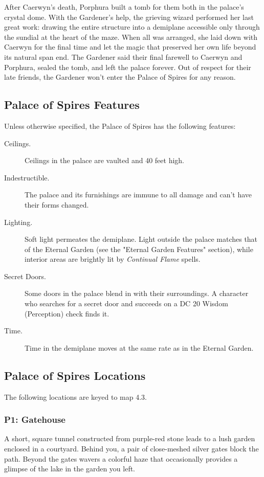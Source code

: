 \documentclass[10pt,a4paper,twoside,bg=print,twocolumn,openany,nodeprecatedcode]{dndbook}
\begin{document}
After Caerwyn's death, Porphura built a tomb for them both in the palace's crystal dome. With the Gardener's help, the grieving wizard performed her last great work: drawing the entire structure into a demiplane accessible only through the sundial at the heart of the maze. When all was arranged, she laid down with Caerwyn for the final time and let the magic that preserved her own life beyond its natural span end. The Gardener said their final farewell to Caerwyn and Porphura, sealed the tomb, and left the palace forever. Out of respect for their late friends, the Gardener won't enter the Palace of Spires for any reason.

\subsection{Palace of Spires Features}
Unless otherwise specified, the Palace of Spires has the following features:


\begin{description}
\item[Ceilings.]
Ceilings in the palace are vaulted and 40 feet high.
\item[Indestructible.]
The palace and its furnishings are immune to all damage and can't have their forms changed.
\item[Lighting.]
Soft light permeates the demiplane. Light outside the palace matches that of the Eternal Garden (see the "Eternal Garden Features" section), while interior areas are brightly lit by \textit{Continual Flame} spells.
\item[Secret Doors.]
Some doors in the palace blend in with their surroundings. A character who searches for a secret door and succeeds on a DC 20 Wisdom (Perception) check finds it.
\item[Time.]
Time in the demiplane moves at the same rate as in the Eternal Garden.
\end{description}

\subsection{Palace of Spires Locations}
The following locations are keyed to map 4.3.

\subsubsection{P1: Gatehouse}
\begin{DndReadAloud}{}
A short, square tunnel constructed from purple-red stone leads to a lush garden enclosed in a courtyard. Behind you, a pair of close-meshed silver gates block the path. Beyond the gates wavers a colorful haze that occasionally provides a glimpse of the lake in the garden you left.

\end{DndReadAloud}
\end{document}
